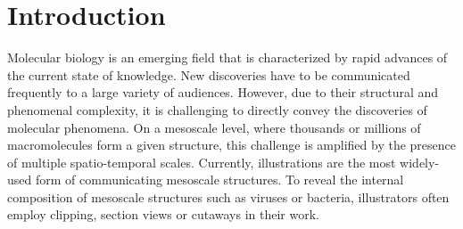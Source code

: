 \section{Introduction}\label{sec:intro}

Molecular biology is an emerging field that is characterized by rapid advances of the current state of knowledge.
New discoveries have to be communicated frequently to a large variety of audiences.
However, due to their structural and phenomenal complexity, it is challenging to directly convey the discoveries of molecular phenomena. On a mesoscale level, where thousands or millions of macromolecules form a given structure, this challenge is amplified by the presence of multiple spatio-temporal scales. Currently, illustrations are the most widely-used form of communicating mesoscale structures. To reveal the internal composition of mesoscale structures such as viruses or bacteria, illustrators often employ clipping, section views or cutaways in their work.



